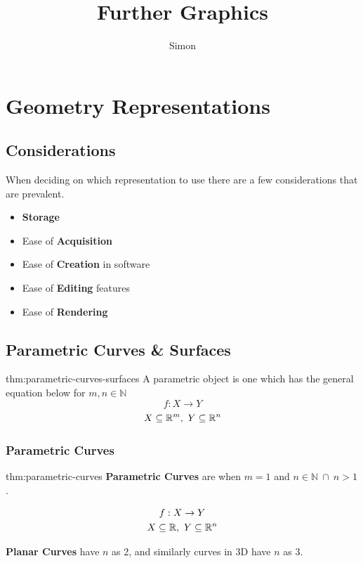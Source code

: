 \documentclass{article}
\title{Further Graphics}
\author{Simon}
\begin{document}
\maketitle

\tableofcontents
\newpage

\section{Geometry Representations}

\subsection{Considerations}

When deciding on which representation to use there are a few considerations that are prevalent.

\begin{itemize}[itemsep=-4px, label={--}]
    \item \textbf{Storage}
    \item Ease of \textbf{Acquisition}
    \item Ease of \textbf{Creation} in software
    \item Ease of \textbf{Editing} features
    \item Ease of \textbf{Rendering}
\end{itemize}

\subsection{Parametric Curves \& Surfaces}

\begin{defin}{thm:parametric-curves-surfaces}
    A parametric object is one which has the general equation below for \(m,n \in \mathbb{N}\)
    \[
        f: X \rightarrow Y
    \]
    \[
        X \subseteq \mathbb{R}^m, \ Y \subseteq \mathbb{R}^n
    \]
\end{defin}

\subsubsection{Parametric Curves}

\begin{defin}{thm:parametric-curves}
    \textbf{Parametric Curves} are when \(m=1\) and \(n \in \mathbb{N} \ \cap \ n > 1\).

    \begin{gather*}
        f: X \rightarrow Y \\
        X \subseteq \mathbb{R}, \ Y \subseteq \mathbb{R}^n
    \end{gather*}

    \textbf{Planar Curves} have \(n\) as 2, and similarly curves in 3D have \(n\) as 3.
\end{defin}
\end{document}
